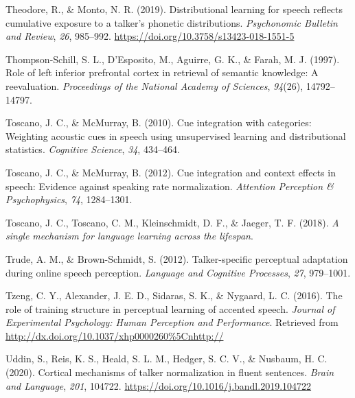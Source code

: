 \documentclass[
  11pt,
  man,floatsintext]{apa6}
\newlength{\cslhangindent}
\newlength{\cslentryspacingunit} %
\newenvironment{CSLReferences}[2] %
 {%
  \setlength{\parindent}{0pt}
  \ifodd #1
  \let\oldpar\par
  \def\par{\hangindent=\cslhangindent\oldpar}
  \fi
  \setlength{\parskip}{#2\cslentryspacingunit}
 }%
 {}
\begin{document}
\begin{CSLReferences}{1}{0}
\leavevmode{}%
Theodore, R., \& Monto, N. R. (2019). Distributional learning for speech reflects cumulative exposure to a talker's phonetic distributions. \emph{Psychonomic Bulletin and Review}, \emph{26}, 985--992. \url{https://doi.org/10.3758/s13423-018-1551-5}

\leavevmode{}%
Thompson-Schill, S. L., D'Esposito, M., Aguirre, G. K., \& Farah, M. J. (1997). Role of left inferior prefrontal cortex in retrieval of semantic knowledge: A reevaluation. \emph{Proceedings of the National Academy of Sciences}, \emph{94}(26), 14792--14797.

\leavevmode{}%
Toscano, J. C., \& McMurray, B. (2010). Cue integration with categories: Weighting acoustic cues in speech using unsupervised learning and distributional statistics. \emph{Cognitive Science}, \emph{34}, 434--464.

\leavevmode{}%
Toscano, J. C., \& McMurray, B. (2012). Cue integration and context effects in speech: Evidence against speaking rate normalization. \emph{Attention Perception \& Psychophysics}, \emph{74}, 1284--1301.

\leavevmode{}%
Toscano, J. C., Toscano, C. M., Kleinschmidt, D. F., \& Jaeger, T. F. (2018). \emph{A single mechanism for language learning across the lifespan}.

\leavevmode{}%
Trude, A. M., \& Brown-Schmidt, S. (2012). Talker-specific perceptual adaptation during online speech perception. \emph{Language and Cognitive Processes}, \emph{27}, 979--1001.

\leavevmode{}%
Tzeng, C. Y., Alexander, J. E. D., Sidaras, S. K., \& Nygaard, L. C. (2016). The role of training structure in perceptual learning of accented speech. \emph{Journal of Experimental Psychology: Human Perception and Performance}. Retrieved from \url{http://dx.doi.org/10.1037/xhp0000260\%5Cnhttp://}

\leavevmode{}%
Uddin, S., Reis, K. S., Heald, S. L. M., Hedger, S. C. V., \& Nusbaum, H. C. (2020). Cortical mechanisms of talker normalization in fluent sentences. \emph{Brain and Language}, \emph{201}, 104722. \url{https://doi.org/10.1016/j.bandl.2019.104722}


\end{CSLReferences}
\end{document}
